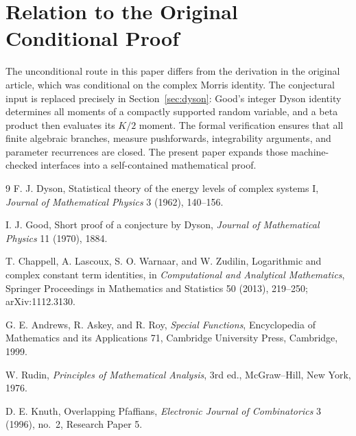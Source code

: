 \documentclass[11pt,a4paper]{article}
\theoremstyle{definition}
\begin{document}
\section*{Relation to the Original Conditional Proof}

The unconditional route in this paper differs from the derivation in
the original article, which was conditional on the complex Morris
identity.  The conjectural input is replaced precisely in
Section~\ref{sec:dyson}: Good's integer Dyson identity determines all
moments of a compactly supported random variable, and a beta product
then evaluates its $K/2$ moment.  The formal verification ensures that
all finite algebraic branches, measure pushforwards, integrability
arguments, and parameter recurrences are closed.  The present paper
expands those machine-checked interfaces into a self-contained
mathematical proof.

\begingroup
\small
\begin{thebibliography}{9}
F. J. Dyson,
\newblock Statistical theory of the energy levels of complex systems I,
\newblock \emph{Journal of Mathematical Physics} 3 (1962), 140--156.

I. J. Good,
\newblock Short proof of a conjecture by Dyson,
\newblock \emph{Journal of Mathematical Physics} 11 (1970), 1884.

T. Chappell, A. Lascoux, S. O. Warnaar, and W. Zudilin,
\newblock Logarithmic and complex constant term identities,
\newblock in \emph{Computational and Analytical Mathematics},
Springer Proceedings in Mathematics and Statistics 50
(2013), 219--250; arXiv:1112.3130.

G. E. Andrews, R. Askey, and R. Roy,
\newblock \emph{Special Functions},
\newblock Encyclopedia of Mathematics and its Applications 71,
Cambridge University Press, Cambridge, 1999.

W. Rudin,
\newblock \emph{Principles of Mathematical Analysis}, 3rd ed.,
\newblock McGraw--Hill, New York, 1976.

D. E. Knuth,
\newblock Overlapping Pfaffians,
\newblock \emph{Electronic Journal of Combinatorics} 3 (1996),
no.~2, Research Paper 5.
\end{thebibliography}
\endgroup
\end{document}
